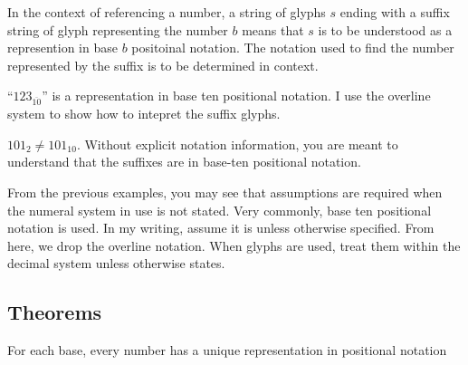 \documentclass{article}
\begin{document}
	\begin{definition}
		In the context of referencing a number, a string of glyphs $s$ ending with a suffix string of glyph representing the number $b$ means that $s$ is to be understood as a represention in base $b$ positoinal notation. The notation used to find the number represented by the suffix is to be determined in context.
	\end{definition}
	\begin{example}
		``$123_{\overline{10}}$'' is a representation in base ten positional notation. I use the overline system to show how to intepret the suffix glyphs.
	\end{example}
	\begin{example}
		$101_2\neq 101_{10}$. Without explicit notation information, you are meant to understand that the suffixes are in base-ten positional notation. 
	\end{example}
	
		
	From the previous examples, you may see that assumptions are required when the numeral system in use is not stated. Very commonly, base ten positional notation is used. In my writing, assume it is unless otherwise specified. From here, we drop the overline notation. When glyphs are used, treat them within the decimal system unless otherwise states.
	
	\subsection{Theorems}
	\begin{theorem}\label{thm1}
		For each base, every number has a unique representation in positional notation
	\end{theorem}
	
	
\end{document}

